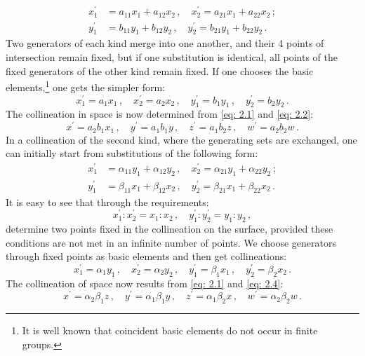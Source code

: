 \documentclass[leqno]{article}
\begin{document}
\begin{align*}
	x_1^\prime &= a_{11} x_1 + a_{12} x_2 \, , \quad x_2^\prime = a_{21} x_1 + a_{22} x_2 \, ; \\
	y_1^\prime &= b_{11} y_1 + b_{12} y_2 \, , \quad y_2^\prime = b_{21} y_1 + b_{22} y_2 \, . 
\end{align*}
Two generators of each kind merge into one another, and their 4 points of intersection remain fixed, but if one substitution is identical, all points of the fixed generators of the other kind remain fixed. If one chooses the basic elements,\footnote{It is well known that coincident basic elements do not occur in finite groups.} one gets the simpler form:
\begin{equation}\label{eq: 2.2}
x_1^\prime = a_1 x_1 \, , \quad x_2^\prime = a_2 x_2 \, , \quad y_1^\prime = b_1 y_1 \, , \quad y_2^\prime = b_2 y_2 \, . \tag{2}
\end{equation}
The collineation in space is now determined from \eqref{eq: 2.1} and \eqref{eq: 2.2}:
\begin{equation}\label{eq: 2.3}
x^\prime = a_2 b_1 x_1 \, , \quad y^\prime = a_1 b_1 y \, , \quad z^\prime = a_1 b_2 z \, , \quad w^\prime = a_2 b_2 w \, . \tag{3}
\end{equation}
In a collineation of the second kind, where the generating sets are exchanged, one can initially start from substitutions of the following form:
\begin{align*}
	x_1^\prime &= \alpha_{11} y_1 + \alpha_{12} y_2 \, , \quad x_2^\prime = \alpha_{21} y_1 + \alpha_{22} y_2 \, ; \\
	y_1^\prime &= \beta_{11} x_1 + \beta_{12} x_2 \, , \quad y_2^\prime = \beta_{21} x_1 + \beta_{22} x_2 \, . 
\end{align*}
It is easy to see that through the requirements:
\[
x_1^\prime : x_2^\prime = x_1 : x_2 \, , \quad y_1^\prime: y_2^\prime = y_1 : y_2 \, , 
\]
determine two points fixed in the collineation on the surface, provided these conditions are not met in an infinite number of points. We choose generators through fixed points as basic elements and then get collineations: 
\begin{equation}\label{eq: 2.4}
x_1^\prime = \alpha_1 y_1 \, , \quad x_2^\prime = \alpha_2 y_2 \, , \quad y_1^\prime = \beta_1 x_1 \, , \quad y_2^\prime = \beta_2 x_2 \, . \tag{4}
\end{equation}
The collineation of space now results from \eqref{eq: 2.1} and \eqref{eq: 2.4}: 
\begin{equation}\label{eq: 2.5}
x^\prime = \alpha_2 \beta_1 z \, , \quad y^\prime = \alpha_1 \beta_1 y \, , \quad z^\prime = \alpha_1 \beta_2 x \, , \quad w^\prime = \alpha_2 \beta_2 w \, . \tag{5}
\end{equation}
\end{document}
